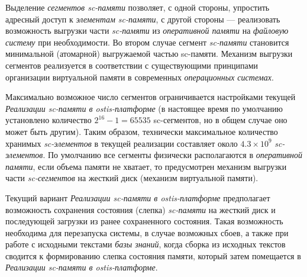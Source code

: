 Выделение \textit{сегментов sc-памяти} позволяет, с одной стороны, упростить адресный доступ к \textit{элементам sc-памяти}, с другой стороны --- реализовать возможность выгрузки части \textit{sc-памяти} из \textit{оперативной памяти} на \textit{файловую систему} при необходимости. Во втором случае сегмент \textit{sc-памяти} становится минимальной (атомарной) выгружаемой частью sc-памяти. Механизм выгрузки сегментов реализуется в соответствии с существующими принципами организации виртуальной памяти в современных \textit{операционных системах}.

Максимально возможное число сегментов ограничивается настройками текущей \textit{Реализации sc-памяти в ostis-платформе} (в настоящее время по умолчанию установлено количество \textit{$2^{16}-1=65535$} sc-сегментов, но в общем случае оно может быть другим). Таким образом, технически максимальное количество хранимых \textit{sc-элементов} в текущей реализации составляет около \textit{$4.3 \times 10^{9}$} \textit{sc-элементов}. По умолчанию все сегменты физически располагаются в \textit{оперативной памяти}, если объема памяти не хватает, то предусмотрен механизм выгрузки части \textit{sc-сегментов} на жесткий диск (механизм виртуальной памяти).

Текущий вариант \textit{Реализации sc-памяти в ostis-платформе} предполагает возможность сохранения состояния (слепка) \textit{sc-памяти} на жесткий диск и последующей загрузки из ранее сохраненного состояния. Такая возможность необходима для перезапуска системы, в случае возможных сбоев, а также при работе с исходными текстами \textit{базы знаний}, когда сборка из исходных текстов сводится к формированию слепка состояния памяти, который затем помещается в \textit{Реализации sc-памяти в ostis-платформе}.

